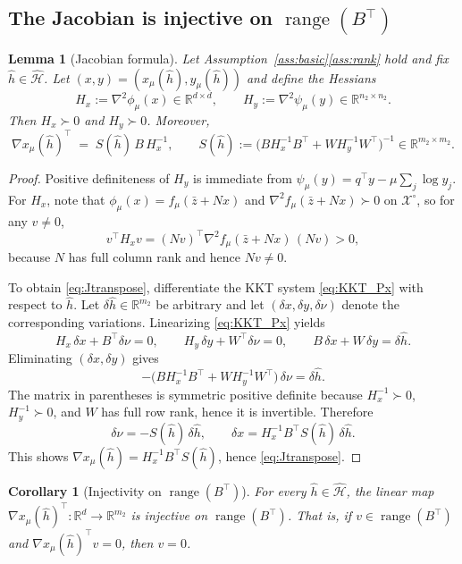 \documentclass[11pt]{article}
\newcommand{\R}{\mathbb{R}}
\DeclareMathOperator{\range}{range}
\theoremstyle{plain}
\newtheorem{lemma}{Lemma}
\newtheorem{corollary}{Corollary}
\theoremstyle{definition}
\begin{document}
\subsection{The Jacobian is injective on $\range(B^\top)$}

\begin{lemma}[Jacobian formula]\label{lem:Jacobian}
Let Assumption~\ref{ass:basic}\ref{ass:rank} hold and fix $\hat h\in\hat{\mathcal{H}}$.
Let $(x,y)=(x_\mu(\hat h),y_\mu(\hat h))$ and define the Hessians
\[
H_x := \nabla^2\phi_\mu(x)\in\R^{d\times d},\qquad
H_y := \nabla^2\psi_\mu(y)\in\R^{n_2\times n_2}.
\]
Then $H_x\succ 0$ and $H_y\succ 0$. Moreover,
\begin{equation}\label{eq:Jtranspose}
\nabla x_\mu(\hat h)^\top
\;=\;
S(\hat h)\,B\,H_x^{-1},
\qquad
S(\hat h):=\big(BH_x^{-1}B^\top + W H_y^{-1}W^\top\big)^{-1}\in\R^{m_2\times m_2}.
\end{equation}
\end{lemma}

\begin{proof}
Positive definiteness of $H_y$ is immediate from $\psi_\mu(y)=q^\top y-\mu\sum_j\log y_j$.
For $H_x$, note that $\phi_\mu(x)=f_\mu(\bar z+Nx)$ and $\nabla^2 f_\mu(\bar z+Nx)\succ 0$ on $\mathcal{X}^\circ$,
so for any $v\neq 0$,
\[
v^\top H_x v
=
(Nv)^\top \nabla^2 f_\mu(\bar z+Nx)\,(Nv) > 0,
\]
because $N$ has full column rank and hence $Nv\neq 0$.

To obtain \eqref{eq:Jtranspose}, differentiate the KKT system \eqref{eq:KKT_Px} with respect to $\hat h$.
Let $\delta \hat h\in\R^{m_2}$ be arbitrary and let $(\delta x,\delta y,\delta \nu)$ denote the corresponding
variations. Linearizing \eqref{eq:KKT_Px} yields
\[
H_x\,\delta x + B^\top \delta\nu = 0,\qquad
H_y\,\delta y + W^\top \delta\nu = 0,\qquad
B\,\delta x + W\,\delta y = \delta \hat h.
\]
Eliminating $(\delta x,\delta y)$ gives
\[
-\big(BH_x^{-1}B^\top + W H_y^{-1}W^\top\big)\,\delta\nu = \delta \hat h.
\]
The matrix in parentheses is symmetric positive definite because $H_x^{-1}\succ 0$, $H_y^{-1}\succ 0$,
and $W$ has full row rank, hence it is invertible. Therefore
\[
\delta\nu = -S(\hat h)\,\delta\hat h,
\qquad
\delta x = H_x^{-1}B^\top S(\hat h)\,\delta\hat h.
\]
This shows $\nabla x_\mu(\hat h)=H_x^{-1}B^\top S(\hat h)$, hence \eqref{eq:Jtranspose}.
\end{proof}

\begin{corollary}[Injectivity on $\range(B^\top)$]\label{cor:injective}
For every $\hat h\in\hat{\mathcal{H}}$, the linear map $\nabla x_\mu(\hat h)^\top:\R^d\to\R^{m_2}$
is injective on $\range(B^\top)$. That is, if $v\in\range(B^\top)$ and $\nabla x_\mu(\hat h)^\top v=0$,
then $v=0$.
\end{corollary}
\end{document}
